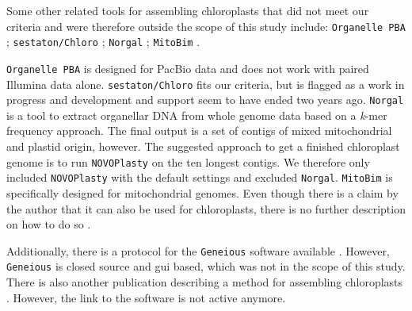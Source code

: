 \documentclass{bmcart}
\newcommand{\formatprogramnames}[1]{\texttt{#1}}
\newcommand{\np}{\formatprogramnames{NOVOPlasty}}
\begin{document}
Some other related tools for assembling chloroplasts that did not meet our criteria and were therefore outside the scope of this study include:
\texttt{Organelle PBA} \cite{Soorni2017}; \texttt{sestaton/Chloro} \cite{sestaton}; \texttt{Norgal}  \cite{Al-Nakeeb2017}; \texttt{MitoBim} \cite{mitobim2013}.

\texttt{Organelle PBA} is designed for PacBio data and does not work with paired Illumina data alone.
\texttt{sestaton/Chloro} fits our criteria, but is flagged as a work in progress and development and support seem to have ended two years ago.
\texttt{Norgal} is a tool to extract organellar DNA from whole genome data based on a \textit{k}-mer frequency approach. The final output is a set of contigs of mixed mitochondrial and plastid origin, however. The suggested approach to get a finished chloroplast genome is to run \np{} on the ten longest contigs. We therefore only included \np{} with the default settings and excluded \texttt{Norgal}.
\texttt{MitoBim} is specifically designed for mitochondrial genomes. Even though there is a claim by the author that it can also be used for chloroplasts, there is no further description on how to do so \cite{mitobim_issue16}.

Additionally, there is a protocol for the \texttt{Geneious} \cite{geneious} software available \cite{geneious-protocol}.
However, \texttt{Geneious} is closed source and \gls{gui} based, which was not in the scope of this study.
There is also another publication describing a method for assembling chloroplasts \cite{method-description-paper}.
However, the link to the software is not active anymore.
\end{document}
